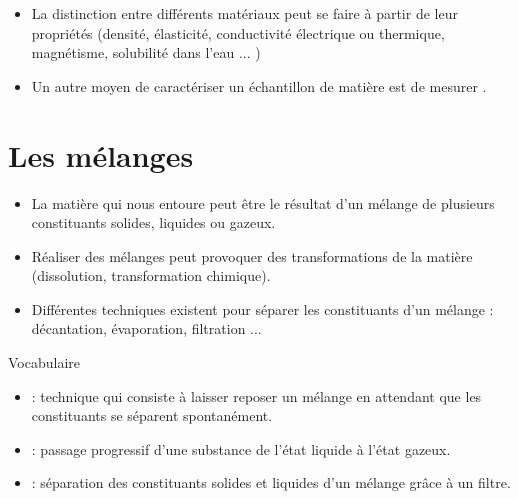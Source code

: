 \documentclass[xcolor={dvipsnames}]{beamer}
\begin{document}
\begin{frame}


\begin{block}{}
	\begin{itemize}
		\item La distinction entre différents matériaux peut se faire à partir de leur propriétés (densité, élasticité, conductivité électrique ou thermique, magnétisme, solubilité dans l'eau ...  )
		
		\item Un autre moyen de caractériser un échantillon de matière est de mesurer . 
	\end{itemize}
	
		
\end{block}

\end{frame}

\section{Les mélanges}

\begin{frame}
	\begin{block}{}
		\begin{itemize}
			\item La matière qui nous entoure peut être le résultat d'un mélange de plusieurs constituants solides, liquides ou gazeux.\pause
			
			\item Réaliser des mélanges peut provoquer des transformations de la matière (dissolution, transformation chimique).\pause
			
			\item Différentes techniques existent pour séparer les constituants d'un mélange : décantation, évaporation, filtration ...
		\end{itemize}
	
	
	\end{block}

\end{frame}

\begin{frame}

\begin{block}{\Large{Vocabulaire}}
	\begin{itemize}
		\item {} : \pause  technique qui consiste à laisser reposer un mélange en attendant que les constituants se séparent spontanément.
		
		\item {} : \pause passage progressif d'une substance de l'état liquide à l'état gazeux.
		
		\item {} : \pause séparation des constituants solides et liquides d'un mélange grâce à un filtre.
	\end{itemize}
\end{block}

\end{frame}
\end{document}
